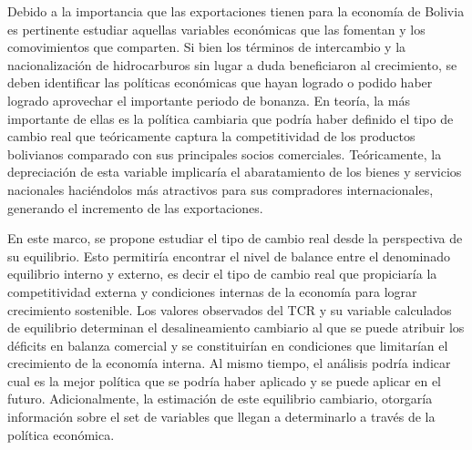 \documentclass[12pt,letterpaper]{article}
\begin{document}
Debido a la importancia que las exportaciones tienen para la economía de Bolivia es pertinente estudiar aquellas variables económicas que las fomentan y los comovimientos que comparten. Si bien los términos de intercambio y la nacionalización de hidrocarburos sin lugar a duda beneficiaron al crecimiento, se deben identificar las políticas económicas que hayan logrado o podido haber logrado aprovechar el importante periodo de bonanza. En teoría, la más importante de ellas es la política cambiaria que podría haber definido el tipo de cambio real que teóricamente captura la competitividad de los productos bolivianos comparado con sus principales socios comerciales. Teóricamente, la depreciación de esta variable implicaría el abaratamiento de los bienes y servicios nacionales haciéndolos más atractivos para sus compradores internacionales, generando el incremento de las exportaciones.


En este marco, se propone estudiar el tipo de cambio real desde la perspectiva de su equilibrio. Esto permitiría encontrar el nivel de balance entre el denominado equilibrio interno y externo, es decir el tipo de cambio real que propiciaría la competitividad externa y condiciones internas de la economía para lograr crecimiento sostenible. Los valores observados del TCR y su variable calculados de equilibrio determinan el desalineamiento cambiario al que se puede atribuir los déficits en balanza comercial y se constituirían en condiciones que limitarían el crecimiento de la economía interna. Al mismo tiempo, el análisis podría indicar cual es la mejor política que se podría haber aplicado y se puede aplicar en el futuro. Adicionalmente, la estimación de este equilibrio cambiario, otorgaría información sobre el set de variables que llegan a determinarlo a través de la política económica.
\end{document}
